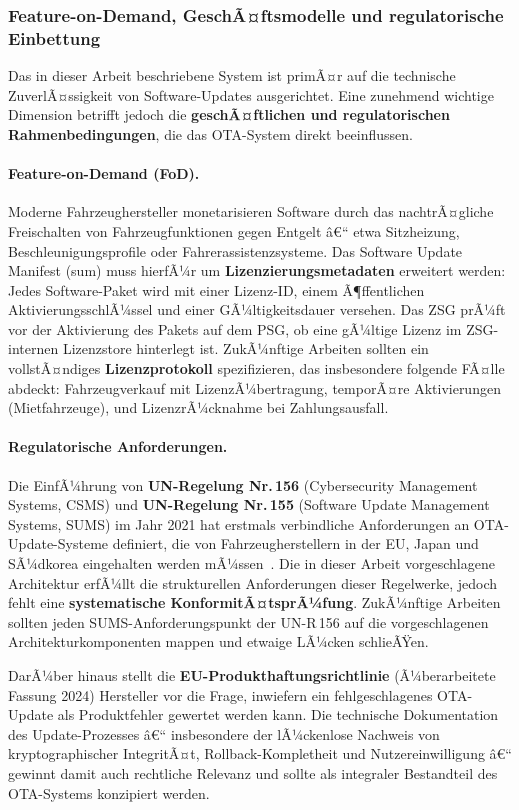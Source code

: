 ﻿\documentclass[12pt,a4paper,twoside]{article}
\begin{document}
\subsubsection{Feature-on-Demand, GeschÃ¤ftsmodelle und regulatorische Einbettung}

Das in dieser Arbeit beschriebene System ist primÃ¤r auf die technische
ZuverlÃ¤ssigkeit von Software-Updates ausgerichtet. Eine zunehmend
wichtige Dimension betrifft jedoch die \textbf{geschÃ¤ftlichen und
regulatorischen Rahmenbedingungen}, die das OTA-System direkt beeinflussen.

\paragraph{Feature-on-Demand (FoD).}
Moderne Fahrzeughersteller monetarisieren Software durch das nachtrÃ¤gliche
Freischalten von Fahrzeugfunktionen gegen Entgelt â€“ etwa Sitzheizung,
Beschleunigungsprofile oder Fahrerassistenzsysteme. Das Software Update
Manifest (\gls{sum}) muss hierfÃ¼r um \textbf{Lizenzierungsmetadaten}
erweitert werden: Jedes Software-Paket wird mit einer
Lizenz-ID, einem Ã¶ffentlichen AktivierungsschlÃ¼ssel und
einer GÃ¼ltigkeitsdauer versehen. Das ZSG prÃ¼ft vor der Aktivierung
des Pakets auf dem PSG, ob eine gÃ¼ltige Lizenz im ZSG-internen
Lizenzstore hinterlegt ist. ZukÃ¼nftige Arbeiten sollten ein
vollstÃ¤ndiges \textbf{Lizenzprotokoll} spezifizieren, das
insbesondere folgende FÃ¤lle abdeckt: Fahrzeugverkauf mit
LizenzÃ¼bertragung, temporÃ¤re Aktivierungen (Mietfahrzeuge),
und LizenzrÃ¼cknahme bei Zahlungsausfall.

\paragraph{Regulatorische Anforderungen.}
Die EinfÃ¼hrung von \textbf{UN-Regelung Nr.\,156} (Cybersecurity
Management Systems, CSMS) und \textbf{UN-Regelung Nr.\,155}
(Software Update Management Systems, SUMS) im Jahr 2021 hat erstmals
verbindliche Anforderungen an OTA-Update-Systeme definiert, die von
Fahrzeugherstellern in der EU, Japan und SÃ¼dkorea eingehalten werden
mÃ¼ssen~\cite{iso21434}. Die in dieser Arbeit vorgeschlagene Architektur
erfÃ¼llt die strukturellen Anforderungen dieser Regelwerke, jedoch fehlt
eine \textbf{systematische KonformitÃ¤tsprÃ¼fung}. ZukÃ¼nftige Arbeiten
sollten jeden SUMS-Anforderungspunkt der UN-R\,156 auf die vorgeschlagenen
Architekturkomponenten mappen und etwaige LÃ¼cken schlieÃŸen.

DarÃ¼ber hinaus stellt die \textbf{EU-Produkthaftungsrichtlinie}
(Ã¼berarbeitete Fassung 2024) Hersteller vor die Frage,
inwiefern ein fehlgeschlagenes OTA-Update als Produktfehler gewertet
werden kann. Die technische Dokumentation des Update-Prozesses â€“
insbesondere der lÃ¼ckenlose Nachweis von kryptographischer IntegritÃ¤t,
Rollback-Kompletheit und Nutzereinwilligung â€“ gewinnt damit auch
rechtliche Relevanz und sollte als integraler Bestandteil des
OTA-Systems konzipiert werden.
\end{document}
